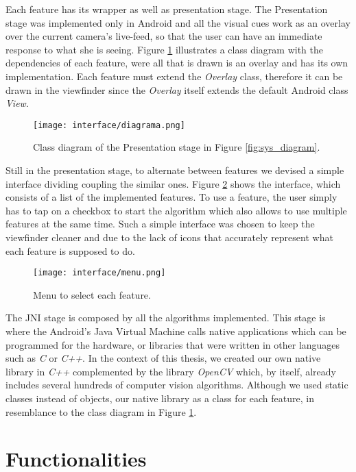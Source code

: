 Each feature has its wrapper as well as presentation stage. The Presentation stage was implemented only in Android and all the visual cues work as an overlay over the current camera's live-feed, so that the user can have an immediate response to what she is seeing. Figure \ref{fig:class_diagram} illustrates a class diagram with the dependencies of each feature, were all that is drawn is an overlay and has its own implementation. Each feature must extend the \emph{Overlay} class, therefore it can be drawn in the viewfinder since the \emph{Overlay} itself extends the default Android class \emph{View}.

\begin{figure}[htb]
	\centering
	\texttt{[image: interface/diagrama.png]}
	\caption{Class diagram of the Presentation stage in Figure \ref{fig:sys_diagram}.}
	\label{fig:class_diagram}
\end{figure}

Still in the presentation stage, to alternate between features we devised a simple interface dividing coupling the similar ones. Figure \ref{fig:app_menu} shows the interface, which consists of a list of the implemented features. To use a feature, the user simply has to tap on a checkbox to start the algorithm which also allows to use multiple features at the same time. Such a simple interface was chosen to keep the viewfinder cleaner and due to the lack of icons that accurately represent what each feature is supposed to do.
\begin{figure}[htb]
	\centering
	\texttt{[image: interface/menu.png]}
	\caption{Menu to select each feature.}
	\label{fig:app_menu}
\end{figure}


The JNI stage is composed by all the algorithms implemented. This stage is where the Android's Java Virtual Machine calls native applications which can be programmed for the hardware, or libraries that were written in other languages such as \emph{C} or \emph{C++}. In the context of this thesis, we created our own native library in \emph{C++} complemented by the library \emph{OpenCV} which, by itself, already includes several hundreds of computer vision algorithms. Although we used static classes instead of objects, our native library as a class for each feature, in resemblance to the class diagram in Figure \ref{fig:class_diagram}.

\section{Functionalities}
\label{sec:functionalities}


